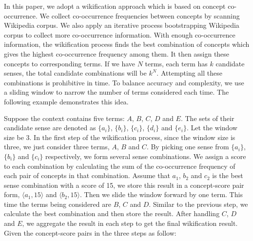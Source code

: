 
In this paper, we adopt a wikification approach which is based on
concept co-occurrence.
We collect co-occurrence frequencies between concepts by
scanning Wikipedia corpus. We also apply an iterative process
bootstrapping Wikipedia corpus to collect more co-occurrence information. With enough
co-occurrence information, the wikification process finds the best combination
of concepts which gives the highest co-occurrence frequency among them.
It then assign these concepts to corresponding terms.
If we have $N$ terms, each term has $k$ candidate senses,
the total candidate combinations will be $k^N$. Attempting all these combinations is
prohibitive in time.
To balance accuracy and complexity, we use a sliding window to
narrow the number of terms considered each time.
The following example demonstrates this idea.

Suppose the context contains five terms: $A$, $B$, $C$, $D$ and $E$. The sets of their candidate sense
are denoted as $\{a_i\}$, $\{b_i\}$, $\{c_i\}$, $\{d_i\}$ and $\{e_i\}$.
Let the window size be 3.
In the first step of the wikification process, since the window size is three,
we just consider three terms, $A$, $B$ and $C$.
By picking one sense from $\{a_i\}$, $\{b_i\}$ and $\{c_i\}$ respectively,
we form several sense combinations. We assign a score to each combination by calculating the sum of
the co-occurrence frequency of each pair of concepts in that combination. Assume that
$a_1$, $b_2$ and $c_2$ is the best sense combination with a score of 15,
we store this result in a concept-score pair form,
$\langle a_1,15\rangle$ and $\langle b_2,15\rangle$. Then we slide the window forward
by one term.  This time the terms being considered are $B$, $C$ and $D$.
Similar to the previous step, we calculate
the best combination and then store the result. After handling $C$, $D$ and $E$,
we aggregate the result in each step to get the final wikification result.
Given the concept-score pairs in the three steps as follow:

